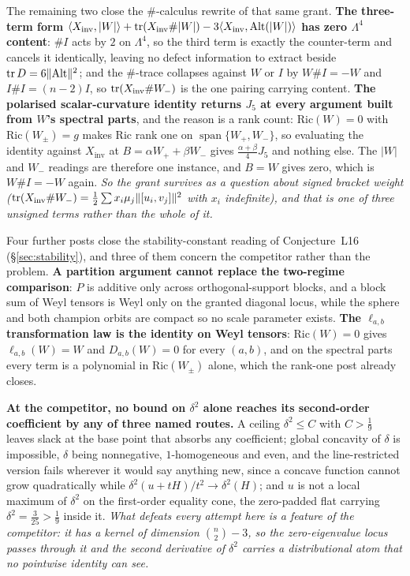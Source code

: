 The remaining two close the $\#$-calculus rewrite of that same grant. \textbf{The three-term form $\langle X_{\mathrm{inv}},|W|\rangle+\operatorname{tr}(X_{\mathrm{inv}}\#|W|)-3\langle X_{\mathrm{inv}},\mathrm{Alt}(|W|)\rangle$ has zero $\Lambda^4$ content}: $\#I$ acts by $2$ on $\Lambda^4$, so the third term is exactly the counter-term and cancels it identically, leaving no defect information to extract beside $\operatorname{tr} D=6\|\mathrm{Alt}\|^2$; and the $\#$-trace collapses against $W$ or $I$ by $W\#I=-W$ and $I\#I=(n-2)I$, so $\operatorname{tr}(X_{\mathrm{inv}}\#W_-)$ is the one pairing carrying content. \textbf{The polarised scalar-curvature identity returns $J_5$ at every argument built from $W$'s spectral parts}, and the reason is a rank count: $\mathrm{Ric}(W)=0$ with $\mathrm{Ric}(W_\pm)=g$ makes $\mathrm{Ric}$ rank one on $\operatorname{span}\{W_+,W_-\}$, so evaluating the identity against $X_{\mathrm{inv}}$ at $B=\alpha W_++\beta W_-$ gives $\tfrac{\alpha+\beta}4J_5$ and nothing else. The $|W|$ and $W_-$ readings are therefore one instance, and $B=W$ gives zero, which is $W\#I=-W$ again. \emph{So the grant survives as a question about signed bracket weight ($\operatorname{tr}(X_{\mathrm{inv}}\#W_-)=\tfrac12\sum x_i\mu_j\|[u_i,v_j]\|^2$ with $x_i$ indefinite), and that is one of three unsigned terms rather than the whole of it.}

Four further posts close the stability-constant reading of Conjecture~L16 (\S\ref{sec:stability}), and three of them concern the competitor rather than the problem. \textbf{A partition argument cannot replace the two-regime comparison}: $P$ is additive only across orthogonal-support blocks, and a block sum of Weyl tensors is Weyl only on the granted diagonal locus, while the sphere and both champion orbits are compact so no scale parameter exists. \textbf{The $\ell_{a,b}$ transformation law is the identity on Weyl tensors}: $\mathrm{Ric}(W)=0$ gives $\ell_{a,b}(W)=W$ and $D_{a,b}(W)=0$ for every $(a,b)$, and on the spectral parts every term is a polynomial in $\mathrm{Ric}(W_\pm)$ alone, which the rank-one post already closes.

\textbf{At the competitor, no bound on $\delta^2$ alone reaches its second-order coefficient by any of three named routes.} A ceiling $\delta^2\le C$ with $C>\tfrac19$ leaves slack at the base point that absorbs any coefficient; global concavity of $\delta$ is impossible, $\delta$ being nonnegative, $1$-homogeneous and even, and the line-restricted version fails wherever it would say anything new, since a concave function cannot grow quadratically while $\delta^2(u+tH)/t^2\to\delta^2(H)$; and $u$ is not a local maximum of $\delta^2$ on the first-order equality cone, the zero-padded flat carrying $\delta^2=\tfrac3{25}>\tfrac19$ inside it. \emph{What defeats every attempt here is a feature of the competitor: it has a kernel of dimension $\binom n2-3$, so the zero-eigenvalue locus passes through it and the second derivative of $\delta^2$ carries a distributional atom that no pointwise identity can see.}

